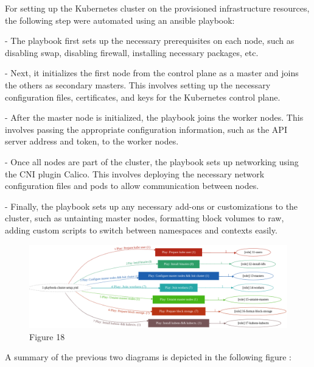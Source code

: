 For setting up the Kubernetes cluster on the provisioned infrastructure resources, the following step were automated using an ansible playbook:

- The playbook first sets up the necessary prerequisites on each node, such as disabling swap, disabling firewall, installing necessary packages, etc.

- Next, it initializes the first node from the control plane as a master and joins the others as secondary masters. This involves setting up the necessary configuration files, certificates, and keys for the Kubernetes control plane.

- After the master node is initialized, the playbook joins the worker nodes. This involves passing the appropriate configuration information, such as the API server address and token, to the worker nodes.

- Once all nodes are part of the cluster, the playbook sets up networking using the CNI plugin Calico. This involves deploying the necessary network configuration files and pods to allow communication between nodes.

- Finally, the playbook sets up any necessary add-ons or customizations to the cluster, such as untainting master nodes, formatting block volumes to raw, adding custom scripts to switch between namespaces and contexts easily.

\begin{figure}[H]\centering
\includegraphics[width=1.0\textwidth,angle=00]{assets/f18.png}
\caption{Figure 18}
\label{fig:fig18}
\end{figure}

A summary of the previous two diagrams is depicted in the following figure :

